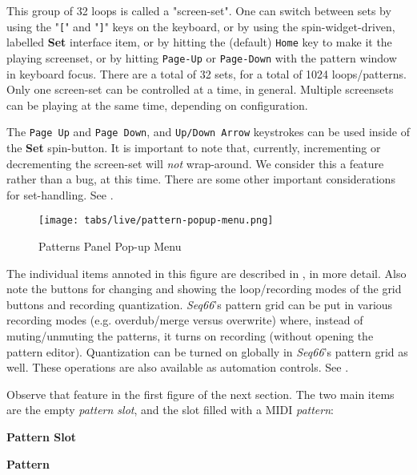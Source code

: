    This group of 32 loops is called a "screen-set".
   One can switch between sets by using the
   \index{keys![}
   "\texttt{[}" and
   \index{keys!]}
   "\texttt{]}" keys on the keyboard, or by using
   the spin-widget-driven, labelled \textbf{Set} interface item, or
   by hitting the (default) \texttt{Home} key to make it the playing screenset,
   or by hitting \texttt{Page-Up} or \texttt{Page-Down} with the pattern window
   in keyboard focus.
   There are a total of 32 sets, for a total of 1024 loops/patterns. 
   Only one screen-set can be controlled at a time, in general.
   Multiple screensets can be playing at the same time, depending on
   configuration.

   The \texttt{Page Up} and \texttt{Page Down}, and \texttt{Up/Down Arrow}
   keystrokes can be used inside of the \textbf{Set} spin-button.
   It is important to note that, currently, incrementing or decrementing
   the screen-set will \textsl{not} wrap-around.
   We consider this a feature rather than a bug, at this time.
   There are some other important considerations for set-handling.
   See .

\begin{figure}[H]
   \centering 
   \texttt{[image: tabs/live/pattern-popup-menu.png]}
   \caption{Patterns Panel Pop-up Menu}
   \label{fig:patterns_panel_popup_menu}
\end{figure}

   The individual items annoted in this figure are described in
   , in more detail.
   Also note the buttons for changing and showing the
   loop/recording modes of the grid buttons and recording quantization.
   \textsl{Seq66}'s pattern grid can be put in various recording
   modes (e.g. overdub/merge versus overwrite) where, instead of
   muting/unmuting the patterns, it turns on recording (without opening the
   pattern editor).
   Quantization can be turned on globally in \textsl{Seq66}'s pattern grid
   as well.
   These operations are also available as automation controls.
   See .

   Observe that feature in the first figure of the next section.
   The two main items are the empty \textsl{pattern slot}, and the slot filled
   with a MIDI \textsl{pattern}:

   \begin{enumber}
      \item \textbf{Pattern Slot}
      \item \textbf{Pattern}
   \end{enumber}

